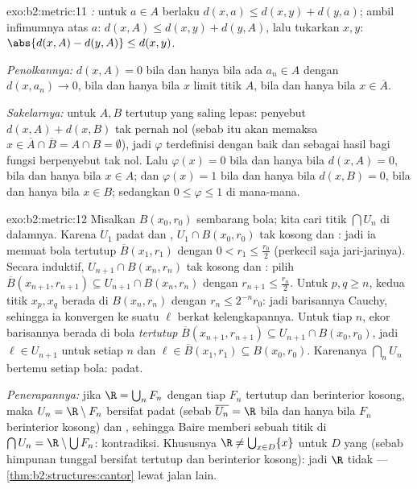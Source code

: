 \begin{solution}{exo:b2:metric:11}
\emph{:} untuk $a \in A$ berlaku $d(x, a) \leq d(x, y) + d(y,
a)$; ambil infimumnya atas $a$: $d(x, A) \leq d(x, y) + d(y,
A)$, lalu tukarkan $x, y$: $\abs{d(x,A) - d(y,A)} \leq d(x,y)$.

\emph{Penolkannya:} $d(x, A) = 0$ bila dan hanya bila ada $a_n \in A$
dengan $d(x, a_n) \to 0$, bila dan hanya bila $x$ limit titik $A$, bila
dan hanya bila $x \in \overline A$.

\emph{Sakelarnya:} untuk $A, B$ tertutup yang saling lepas: penyebut
$d(x,A) + d(x,B)$ tak pernah nol (sebab itu akan memaksa $x \in \overline
A \cap \overline B = A \cap B = \emptyset$), jadi $\varphi$ terdefinisi
dengan baik dan  sebagai hasil bagi fungsi  berpenyebut tak
nol. Lalu $\varphi(x) = 0$ bila dan hanya bila $d(x, A) = 0$, bila dan
hanya bila $x \in A$; dan $\varphi(x) = 1$ bila dan hanya bila $d(x, B) =
0$, bila dan hanya bila $x \in B$; sedangkan $0 \leq \varphi \leq 1$ di mana-mana.
\end{solution}

\begin{solution}{exo:b2:metric:12}
Misalkan $B(x_0, r_0)$ sembarang bola; kita cari titik $\bigcap U_n$
di dalamnya. Karena $U_1$ padat dan , $U_1 \cap B(x_0, r_0)$
tak kosong dan : jadi ia memuat bola tertutup $\overline B(x_1,
r_1)$ dengan $0 < r_1 \leq \frac{r_0}2$ (perkecil saja jari-jarinya).
Secara induktif, $U_{n+1} \cap B(x_n, r_n)$ tak kosong dan : pilih
$\overline B(x_{n+1}, r_{n+1}) \subseteq U_{n+1} \cap B(x_n,
r_n)$ dengan $r_{n+1} \leq \frac{r_n}2$. Untuk $p, q \geq n$, kedua titik
$x_p, x_q$ berada di $B(x_n, r_n)$ dengan $r_n \leq 2^{-n}r_0$: jadi
barisannya Cauchy, sehingga ia konvergen ke suatu $\ell$ berkat
kelengkapannya. Untuk tiap $n$, ekor barisannya berada di bola
\emph{tertutup} $\overline B(x_{n+1}, r_{n+1}) \subseteq U_{n+1}
\cap B(x_0, r_0)$, jadi $\ell \in U_{n+1}$ untuk setiap $n$ dan $\ell
\in \overline B(x_1, r_1) \subseteq B(x_0, r_0)$. Karenanya
$\bigcap_n U_n$ bertemu setiap bola: padat.

\emph{Penerapannya:} jika $\R = \bigcup_n F_n$ dengan tiap $F_n$
tertutup dan berinterior kosong, maka $U_n = \R \setminus F_n$ bersifat
padat (sebab $\overline{U_n} = \R$ bila dan hanya bila $F_n$ berinterior
kosong) dan , sehingga Baire memberi sebuah titik di $\bigcap U_n
= \R \setminus \bigcup F_n$: kontradiksi. Khususnya $\R \neq \bigcup_{x
\in D} \{x\}$ untuk $D$ yang  (sebab himpunan tunggal bersifat
tertutup dan berinterior kosong): jadi $\R$ tidak  ---
\cref{thm:b2:structures:cantor} lewat jalan lain.
\end{solution}

